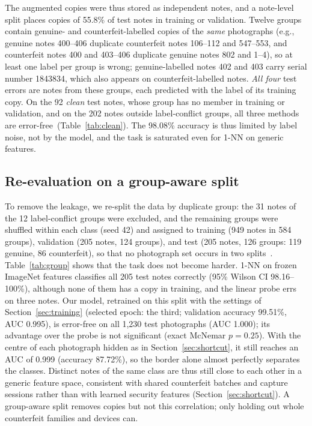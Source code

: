 \documentclass[pdflatex,sn-mathphys-num]{sn-jnl}
\begin{document}
The augmented copies were thus stored as independent notes, and a note-level split
places copies of 55.8\% of test notes in training or validation. Twelve groups contain
genuine- and counterfeit-labelled copies of the \emph{same} photographs (e.g., genuine
notes 400--406 duplicate counterfeit notes 106--112 and 547--553, and counterfeit notes
400 and 403--406 duplicate genuine notes 802 and 1--4), so at least one label per group
is wrong; genuine-labelled notes 402 and 403 carry serial number 1843834, which also
appears on counterfeit-labelled notes. \emph{All four} test errors are notes from these
groups, each predicted with the label of its training copy. On the 92 \emph{clean} test
notes, whose group has no member in training or validation, and on the 202 notes outside
label-conflict groups, all three methods are error-free~(Table~\ref{tab:clean}). The
98.08\% accuracy is thus limited by label noise, not by the model, and the task is
saturated even for 1-NN on generic features.

\subsection{Re-evaluation on a group-aware split}\label{sec:groupsplit}

To remove the leakage, we re-split the data by duplicate group: the 31 notes of the 12
label-conflict groups were excluded, and the remaining groups were shuffled within each
class (seed 42) and assigned to training (949 notes in 584 groups), validation (205
notes, 124 groups), and test (205 notes, 126 groups: 119 genuine, 86 counterfeit), so
that no photograph set occurs in two splits~\cite{roberts2017cv}. Table~\ref{tab:group}
shows that the task does not become harder. 1-NN on frozen ImageNet features classifies
all 205 test notes correctly (95\% Wilson CI 98.16--100\%), although none of them has a
copy in training, and the linear probe errs on three notes. Our model, retrained on this
split with the settings of Section~\ref{sec:training} (selected epoch: the third;
validation accuracy 99.51\%, AUC 0.995), is error-free on all 1{,}230 test photographs (AUC 1.000); its advantage over
the probe is not significant (exact McNemar $p=0.25$). With the centre of each photograph
hidden as in Section~\ref{sec:shortcut}, it still reaches an AUC of 0.999 (accuracy
87.72\%), so the border alone almost perfectly separates the classes. Distinct notes of the same
class are thus still close to each other in a generic feature space, consistent with
shared counterfeit batches and capture sessions rather than with learned security
features (Section~\ref{sec:shortcut}). A group-aware split removes copies but not this
correlation; only holding out whole counterfeit families and devices can.
\end{document}
